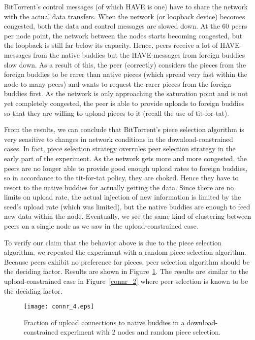 \documentclass[10pt,letterpaper,twocolumn]{article}
\begin{document}
BitTorrent's control messages (of which HAVE is one) have to share the
network with the actual data transfers. When the network (or loopback
device) becomes congested, both the data and control messages are
slowed down. At the 60 peers per node point, the network between the
nodes starts becoming congested, but the loopback is still far below
its capacity. Hence, peers receive a lot of HAVE-messages from the
native buddies but the HAVE-messages from foreign buddies slow
down. As a result of this, the peer (correctly) considers the pieces
from the foreign buddies to be rarer than native pieces (which spread
very fast within the node to many peers) and wants to request the
rarer pieces from the foreign buddies first. As the network is only
approaching the saturation point and is not yet completely congested,
the peer is able to provide uploads to foreign buddies so that they
are willing to upload pieces to it (recall the use of tit-for-tat).



From the results, we can conclude that BitTorrent's piece selection
algorithm is very sensitive to changes in network conditions in the
download-constrained cases. In fact, piece selection strategy
overrules peer selection strategy in the early part of the
experiment. As the network gets more and more congested, the peers are
no longer able to provide good enough upload rates to foreign buddies,
so in accordance to the tit-for-tat policy, they are choked. Hence
they have to resort to the native buddies for actually getting the
data. Since there are no limits on upload rate, the actual injection
of new information is limited by the seed's upload rate (which was
limited), but the native buddies are enough to feed new data within
the node. Eventually, we see the same kind of clustering between peers
on a single node as we saw in the upload-constrained case.

To verify our claim that the behavior above is due to the piece
selection algorithm, we repeated the experiment with a random piece
selection algorithm. Because peers exhibit no preference for pieces,
peer selection algorithm should be the deciding factor. Results are
shown in Figure~\ref{connr_4}. The results are similar to the
upload-constrained case in Figure~\ref{connr_2} where peer selection
is known to be the deciding factor.







\begin{figure}[!tb]
\begin{center}
\texttt{[image: connr\_4.eps]}
\caption{Fraction of upload connections to native buddies in a
  download-constrained experiment with 2 nodes and random piece selection.}
\label{connr_4}
\end{center}
\end{figure}
\end{document}
